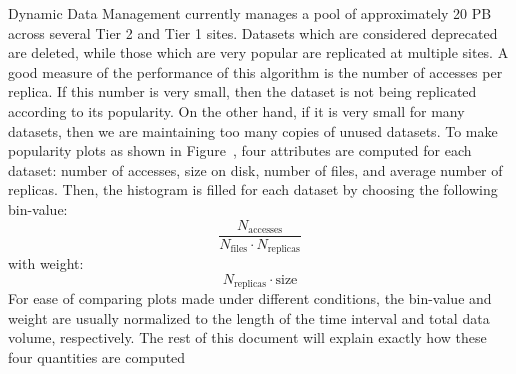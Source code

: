 Dynamic Data Management currently manages a pool of approximately 20 PB across several Tier 2 and Tier 1 sites. Datasets which are considered deprecated are deleted, while those which are very popular are replicated at multiple sites. A good measure of the performance of this algorithm is the number of accesses per replica. If this number is very small, then the dataset is not being replicated according to its popularity. On the other hand, if it is very small for many datasets, then we are maintaining too many copies of unused datasets. To make popularity plots as shown in Figure~, four attributes are computed for each dataset: number of accesses, size on disk, number of files, and average number of replicas. Then, the histogram is filled for each dataset by choosing the following bin-value:
\[\dfrac{N_\text{accesses}}{N_\text{files}\cdot N_\text{replicas}}\]
with weight:
\[N_\text{replicas}\cdot \text{size}\]
For ease of comparing plots made under different conditions, the bin-value and weight are usually normalized to the length of the time interval and total data volume, respectively.  The rest of this document will explain exactly how these four quantities are computed



